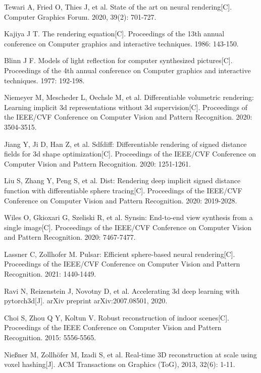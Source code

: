 Tewari A, Fried O, Thies J, et al. State of the art on neural rendering[C]. Computer Graphics Forum. 2020, 39(2): 701-727.


Kajiya J T. The rendering equation[C]. Proceedings of the 13th annual conference on Computer graphics and interactive techniques. 1986: 143-150.

Blinn J F. Models of light reflection for computer synthesized pictures[C]. Proceedings of the 4th annual conference on Computer graphics and interactive techniques. 1977: 192-198.

Niemeyer M, Mescheder L, Oechsle M, et al. Differentiable volumetric rendering: Learning implicit 3d representations without 3d supervision[C]. Proceedings of the IEEE/CVF Conference on Computer Vision and Pattern Recognition. 2020: 3504-3515.

Jiang Y, Ji D, Han Z, et al. Sdfdiff: Differentiable rendering of signed distance fields for 3d shape optimization[C]. Proceedings of the IEEE/CVF Conference on Computer Vision and Pattern Recognition. 2020: 1251-1261.

Liu S, Zhang Y, Peng S, et al. Dist: Rendering deep implicit signed distance function with differentiable sphere tracing[C]. Proceedings of the IEEE/CVF Conference on Computer Vision and Pattern Recognition. 2020: 2019-2028.

Wiles O, Gkioxari G, Szeliski R, et al. Synsin: End-to-end view synthesis from a single image[C]. Proceedings of the IEEE/CVF Conference on Computer Vision and Pattern Recognition. 2020: 7467-7477.

Lassner C, Zollhofer M. Pulsar: Efficient sphere-based neural rendering[C]. Proceedings of the IEEE/CVF Conference on Computer Vision and Pattern Recognition. 2021: 1440-1449.

Ravi N, Reizenstein J, Novotny D, et al. Accelerating 3d deep learning with pytorch3d[J]. arXiv preprint arXiv:2007.08501, 2020.

Choi S, Zhou Q Y, Koltun V. Robust reconstruction of indoor scenes[C]. Proceedings of the IEEE Conference on Computer Vision and Pattern Recognition. 2015: 5556-5565.

 Nießner M, Zollhöfer M, Izadi S, et al. Real-time 3D reconstruction at scale using voxel hashing[J]. ACM Transactions on Graphics (ToG), 2013, 32(6): 1-11.


